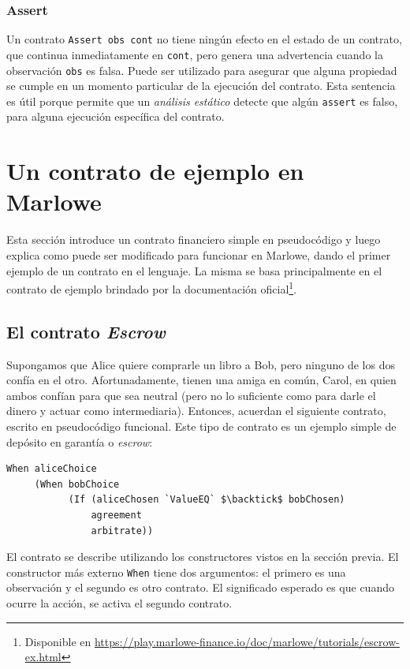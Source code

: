 \documentclass[12pt]{book}
\begin{document}
\subsubsection{Assert}
Un contrato \texttt{Assert obs cont} no tiene ningún efecto en el estado de un contrato, que continua inmediatamente en \texttt{cont}, pero genera una advertencia cuando la observación \texttt{obs} es falsa. Puede ser utilizado para asegurar que alguna propiedad se cumple en un momento particular de la ejecución del contrato. Esta sentencia es útil porque permite que un \textit{análisis estático} detecte que algún \texttt{assert} es falso, para alguna ejecución específica del contrato.


\section{Un contrato de ejemplo en Marlowe}

Esta sección introduce un contrato financiero simple en pseudocódigo y luego explica como puede ser modificado para funcionar en Marlowe, dando el primer ejemplo de un contrato en el lenguaje. La misma se basa principalmente en el contrato de ejemplo brindado por la documentación oficial\footnote{Disponible en \url{https://play.marlowe-finance.io/doc/marlowe/tutorials/escrow-ex.html}}.

\subsection{El contrato \textit{Escrow}}

Supongamos que Alice quiere comprarle un libro a Bob, pero ninguno de los dos confía en el otro. Afortunadamente, tienen una amiga en común, Carol, en quien ambos confían para que sea neutral (pero no lo suficiente como para darle el dinero y actuar como intermediaria). Entonces, acuerdan el siguiente contrato, escrito en pseudocódigo funcional. Este tipo de contrato es un ejemplo simple de depósito en garantía o \textit{escrow}:


\begin{lstlisting}[style=Haskell-cardano, language=Marlowe, caption=Primer pseudocódigo del contrato Escrow.]
When aliceChoice
     (When bobChoice
           (If (aliceChosen `ValueEQ` $\backtick$ bobChosen)
               agreement
               arbitrate))
\end{lstlisting}


El contrato se describe utilizando los constructores vistos en la sección previa. El constructor más externo \texttt{When} tiene dos argumentos: el primero es una observación y el segundo es otro contrato. El significado esperado es que cuando ocurre la acción, se activa el segundo contrato.
\end{document}
